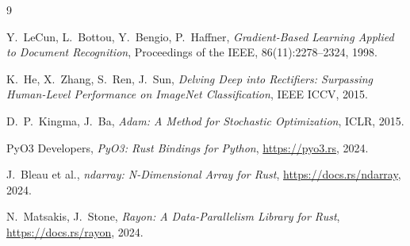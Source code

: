 \documentclass[11pt]{article}
\begin{document}
\begin{thebibliography}{9}

Y.\ LeCun, L.\ Bottou, Y.\ Bengio, P.\ Haffner,
\textit{Gradient-Based Learning Applied to Document Recognition},
Proceedings of the IEEE, 86(11):2278--2324, 1998.

K.\ He, X.\ Zhang, S.\ Ren, J.\ Sun,
\textit{Delving Deep into Rectifiers: Surpassing Human-Level Performance on ImageNet Classification},
IEEE ICCV, 2015.

D.\ P.\ Kingma, J.\ Ba,
\textit{Adam: A Method for Stochastic Optimization},
ICLR, 2015.

PyO3 Developers,
\textit{PyO3: Rust Bindings for Python},
\url{https://pyo3.rs}, 2024.

J.\ Bleau et al.,
\textit{ndarray: N-Dimensional Array for Rust},
\url{https://docs.rs/ndarray}, 2024.

N.\ Matsakis, J.\ Stone,
\textit{Rayon: A Data-Parallelism Library for Rust},
\url{https://docs.rs/rayon}, 2024.

\end{thebibliography}
\end{document}
